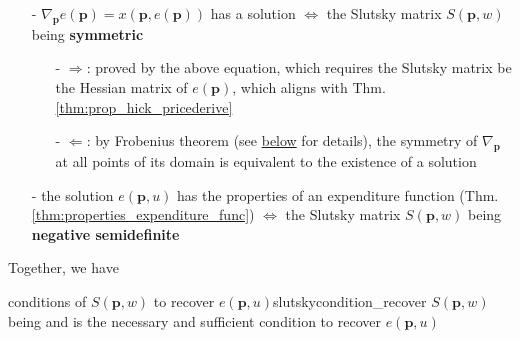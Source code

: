 \begin{enumerate}
    \item[-] $\nabla_{\mathbf{p}}e(\mathbf{p})=x(\mathbf{p},e(\mathbf{p}))$ has a solution $\Leftrightarrow$ the Slutsky matrix $S(\mathbf{p},w)$ being \textbf{symmetric}
    \begin{enumerate}
        \item[-] $\Rightarrow$: proved by the above equation, which requires the Slutsky matrix be the Hessian matrix of $e(\mathbf{p})$, which aligns with Thm.\ref{thm:prop_hick_pricederive}
        \item[-] $\Leftarrow$: by Frobenius theorem (see \hyperref[sssec:frobenius_theorem]{below} for details), the symmetry of $\nabla_{\mathbf{p}}$ at all points of its domain is equivalent to the existence of a solution 
    \end{enumerate}
    \item[-] the solution $e(\mathbf{p},u)$ has the properties of an expenditure function (Thm.\ref{thm:properties_expenditure_func}) $\Leftrightarrow$ the Slutsky matrix $S(\mathbf{p},w)$ being \textbf{negative semidefinite}
\end{enumerate}

Together, we have
\begin{proposition}{conditions of $S(\mathbf{p},w)$ to recover $e(\mathbf{p},u)$}{slutskycondition_recover}
    $S(\mathbf{p},w)$ being  and  is the necessary and sufficient condition to recover $e(\mathbf{p},u)$
\end{proposition}

